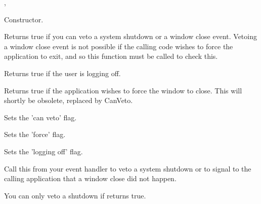 ,\rtfsp
{}


\label{wxcloseeventctor}


Constructor.

\label{wxcloseeventcanveto}


Returns true if you can veto a system shutdown or a window close event.
Vetoing a window close event is not possible if the calling code wishes to
force the application to exit, and so this function must be called to check this.

\label{wxcloseeventgetloggingoff}


Returns true if the user is logging off.

\label{wxcloseeventgetforce}


Returns true if the application wishes to force the window to close.
This will shortly be obsolete, replaced by CanVeto.

\label{wxcloseeventsetcanveto}


Sets the 'can veto' flag.

\label{wxcloseeventsetforce}


Sets the 'force' flag.

\label{wxcloseeventsetloggingoff}


Sets the 'logging off' flag.

\label{wxcloseeventveto}


Call this from your event handler to veto a system shutdown or to signal
to the calling application that a window close did not happen.

You can only veto a shutdown if  returns
true.


